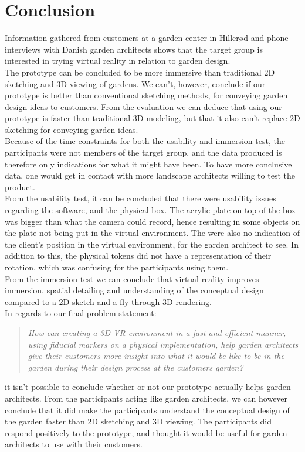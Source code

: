 \chapter{Conclusion}
Information gathered from customers at a garden center in Hillerød and phone interviews with Danish garden architects shows that the target group is interested in trying virtual reality in relation to garden design.\\

The prototype can be concluded to be more immersive than traditional 2D sketching and 3D viewing of gardens. We can't, however, conclude if our prototype is better than conventional sketching methods, for conveying garden design ideas to customers. From the evaluation we can deduce that using our prototype is faster than traditional 3D modeling, but that it also can't replace 2D sketching for conveying garden ideas.\\

Because of the time constraints for both the usability and immersion test, the participants were not members of the target group, and the data produced is therefore only indications for what it might have been. To have more conclusive data, one would get in contact with more landscape architects willing to test the product.\\

From the usability test, it can be concluded that there were usability issues regarding the software, and the physical box. The acrylic plate on top of the box was bigger than what the camera could record, hence resulting in some objects on the plate not being put in the virtual environment. The were also no indication of the client's position in the virtual environment, for the garden architect to see. In addition to this, the physical tokens did not have a representation of their rotation, which was confusing for the participants using them.\\

From the immersion test we can conclude that virtual reality improves immersion, spatial detailing and understanding of the conceptual design compared to a 2D sketch and a fly through 3D rendering.\\

In regards to our final problem statement:\\
\begin{quote}
	\textit{How can creating a 3D VR environment in a fast and efficient manner, using fiducial markers on a physical implementation, help garden architects give their customers more insight into what it would be like to be in the garden during their design process at the customers garden?}\\
\end{quote}
it isn't possible to conclude whether or not our prototype actually helps garden architects. From the participants acting like garden architects, we can however conclude that it did make the participants understand the conceptual design of the garden faster than 2D sketching and 3D viewing. The participants did respond positively to the prototype, and thought it would be useful for garden architects to use with their customers.\\

